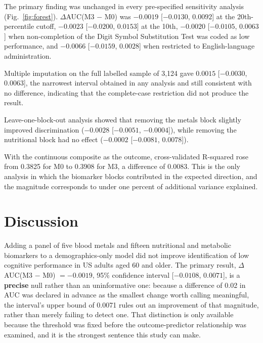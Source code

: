 \documentclass[12pt]{article}
\newcommand{\deltaauc}{$\Delta$AUC}
\begin{document}
The primary finding was unchanged in every pre-specified sensitivity analysis (Fig.~\ref{fig:forest}). \deltaauc(M3 $-$ M0) was $-0.0019$ [$-0.0130$, $0.0092$] at the 20th-percentile cutoff, $-0.0023$ [$-0.0200$, $0.0153$] at the 10th, $-0.0020$ [$-0.0105$, $0.0063$] when non-completion of the Digit Symbol Substitution Test was coded as low performance, and $-0.0066$ [$-0.0159$, $0.0028$] when restricted to English-language administration.

Multiple imputation on the full labelled sample of 3,124 gave $0.0015$ [$-0.0030$, $0.0063$], the narrowest interval obtained in any analysis and still consistent with no difference, indicating that the complete-case restriction did not produce the result.

Leave-one-block-out analysis showed that removing the metals block slightly improved discrimination ($-0.0028$ [$-0.0051$, $-0.0004$]), while removing the nutritional block had no effect ($-0.0002$ [$-0.0081$, $0.0078$]).

With the continuous composite as the outcome, cross-validated R-squared rose from 0.3825 for M0 to 0.3908 for M3, a difference of 0.0083. This is the only analysis in which the biomarker blocks contributed in the expected direction, and the magnitude corresponds to under one percent of additional variance explained.

\section*{Discussion}

Adding a panel of five blood metals and fifteen nutritional and metabolic biomarkers to a demographics-only model did not improve identification of low cognitive performance in US adults aged 60 and older. The primary result, \deltaauc(M3 $-$ M0) $= -0.0019$, 95\% confidence interval [$-0.0108$, $0.0071$], is a \textbf{precise} null rather than an uninformative one: because a difference of 0.02 in AUC was declared in advance as the smallest change worth calling meaningful, the interval's upper bound of 0.0071 rules out an improvement of that magnitude, rather than merely failing to detect one. That distinction is only available because the threshold was fixed before the outcome-predictor relationship was examined, and it is the strongest sentence this study can make.
\end{document}
